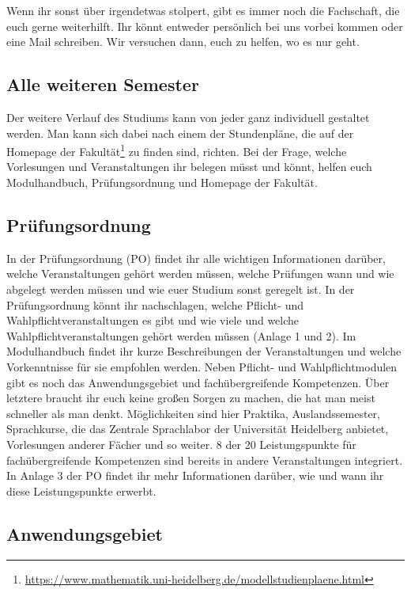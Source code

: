 Wenn ihr sonst über irgendetwas stolpert, gibt es immer noch die Fachschaft, die euch gerne weiterhilft. Ihr könnt entweder persönlich bei uns vorbei kommen oder eine Mail schreiben. Wir versuchen dann, euch zu helfen, wo es nur geht.

\subsection{Alle weiteren Semester}

Der weitere Verlauf des Studiums kann von jeder ganz individuell gestaltet werden. Man kann sich dabei nach einem der Stundenpläne, die auf der Homepage der Fakultät\footnote{\url{https://www.mathematik.uni-heidelberg.de/modellstudienplaene.html}} zu finden sind, richten. Bei der Frage, welche Vorlesungen und Veranstaltungen ihr belegen müsst und könnt, helfen euch Modulhandbuch, Prüfungsordnung und Homepage der Fakultät.

\subsection{Prüfungsordnung}

In der Prüfungsordnung (PO) findet ihr alle wichtigen Informationen darüber, welche Veranstaltungen gehört werden müssen, welche Prüfungen wann und wie abgelegt werden müssen und wie euer Studium sonst geregelt ist. In der Prüfungsordnung könnt ihr nachschlagen, welche Pflicht- und Wahlpflichtveranstaltungen es gibt und wie viele und welche Wahlpflichtveranstaltungen gehört werden müssen (Anlage 1 und 2).  Im Modulhandbuch findet ihr kurze Beschreibungen der Veranstaltungen und welche Vorkenntnisse für sie empfohlen werden. Neben Pflicht- und Wahlpflichtmodulen gibt es noch das Anwendungsgebiet und fachübergreifende Kompetenzen. Über letztere braucht ihr euch keine großen Sorgen zu machen, die hat man meist schneller als man denkt. Möglichkeiten sind hier Praktika, Auslandssemester, Sprachkurse, die das Zentrale Sprachlabor der Universität Heidelberg anbietet, Vorlesungen anderer Fächer und so weiter. 8 der 20 Leistungspunkte für fachübergreifende Kompetenzen sind bereits in andere Veranstaltungen integriert. In Anlage 3 der PO findet ihr mehr Informationen darüber, wie und wann ihr diese Leistungspunkte erwerbt.

\subsection{Anwendungsgebiet}

